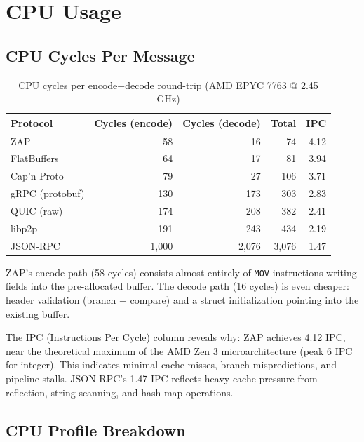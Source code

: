 \documentclass[11pt,letterpaper]{article}
\begin{document}
\section{CPU Usage}

\subsection{CPU Cycles Per Message}

\begin{table}[h]
\centering
\caption{CPU cycles per encode+decode round-trip (AMD EPYC 7763 @ 2.45 GHz)}
\label{tab:cpu}
\begin{tabular}{lrrrr}
\toprule
\textbf{Protocol} & \textbf{Cycles (encode)} & \textbf{Cycles (decode)} & \textbf{Total} & \textbf{IPC} \\
\midrule
\rowcolor{luxblue!10}
ZAP & 58 & 16 & 74 & 4.12 \\
FlatBuffers & 64 & 17 & 81 & 3.94 \\
Cap'n Proto & 79 & 27 & 106 & 3.71 \\
gRPC (protobuf) & 130 & 173 & 303 & 2.83 \\
QUIC (raw) & 174 & 208 & 382 & 2.41 \\
libp2p & 191 & 243 & 434 & 2.19 \\
JSON-RPC & 1,000 & 2,076 & 3,076 & 1.47 \\
\bottomrule
\end{tabular}
\end{table}

ZAP's encode path (58 cycles) consists almost entirely of \texttt{MOV} instructions writing fields into the pre-allocated buffer. The decode path (16 cycles) is even cheaper: header validation (branch + compare) and a struct initialization pointing into the existing buffer.

The IPC (Instructions Per Cycle) column reveals why: ZAP achieves 4.12 IPC, near the theoretical maximum of the AMD Zen 3 microarchitecture (peak 6 IPC for integer). This indicates minimal cache misses, branch mispredictions, and pipeline stalls. JSON-RPC's 1.47 IPC reflects heavy cache pressure from reflection, string scanning, and hash map operations.

\subsection{CPU Profile Breakdown}
\end{document}
